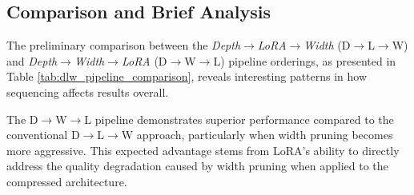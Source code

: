 \subsection{Comparison and Brief Analysis}

The preliminary comparison between the \textit{Depth$\rightarrow$LoRA$\rightarrow$Width} (D$\rightarrow$L$\rightarrow$W) and \textit{Depth$\rightarrow$Width$\rightarrow$LoRA} (D$\rightarrow$W$\rightarrow$L) pipeline orderings, as presented in Table \ref{tab:dlw_pipeline_comparison}, reveals interesting patterns in how sequencing affects results overall.

The D$\rightarrow$W$\rightarrow$L pipeline demonstrates superior performance compared to the conventional D$\rightarrow$L$\rightarrow$W approach, particularly when width pruning becomes more aggressive. This expected advantage stems from LoRA's ability to directly address the quality degradation caused by width pruning when applied to the compressed architecture.

